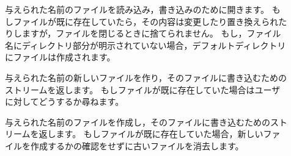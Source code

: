 \documentclass[a4paper,10pt,twoside]{book}
\begin{document}
{\begin{description}
%  
%  
%
%
%
\item[] 与えられた名前のファイルを読み込み，書き込みのために開きます。
  もしファイルが既に存在していたら，その内容は変更したり置き換えられたりしますが，ファイルを閉じるときに捨てられません。
  もし，ファイル名にディレクトリ部分が明示されていない場合，デフォルトディレクトリにファイルは作成されます。
  
\item[] 与えられた名前の新しいファイルを作り，そのファイルに書き込むためのストリームを返します。
  もしファイルが既に存在していた場合はユーザに対してどうするか尋ねます。
  
\item[] 与えられた名前のファイルを作成し，そのファイルに書き込むためのストリームを返します。
  もしファイルが既に存在していた場合，新しいファイルを作成するかの確認をせずに古いファイルを消去します。


\end{description}}
\end{document}
